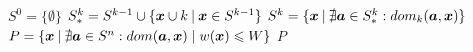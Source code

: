 \begin{algorithmic}[1] %
    \State $S^0 = \big\{\emptyset\big\}$
      \State $S_*^k = S^{k-1} \cup \{\boldsymbol{x} \cup k \:|\: \boldsymbol{x} \in S^{k-1}\}$
      \State $S^k = \{\boldsymbol{x} \:|\: \nexists \boldsymbol{a} \in S_*^k: dom_k(\boldsymbol{a}, \boldsymbol{x}) \}$
    \EndFor
  \State $P = \{\boldsymbol{x} \:|\: \nexists \boldsymbol{a} \in S^n: dom(\boldsymbol{a}, \boldsymbol{x}) \;|\; w(\boldsymbol{x}) \leqslant W \}$
  \State \Return $P$
  \EndFunction
\end{algorithmic}
